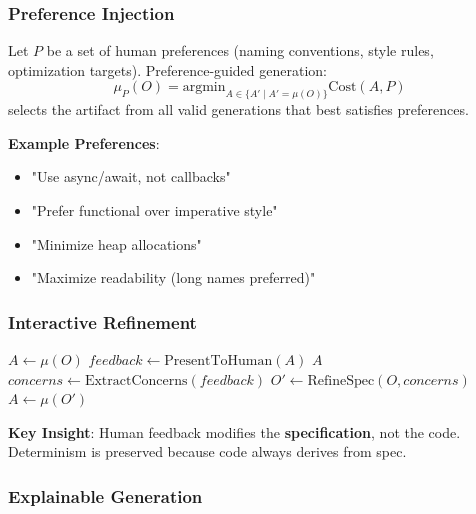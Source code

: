 \subsubsection{Preference Injection}

\begin{definition}
    Let $P$ be a set of human preferences (naming conventions, style rules, optimization targets). Preference-guided generation:
    \begin{equation}
        \mu_P(O) = \text{argmin}_{A \in \{A' \mid A' = \mu(O)\}} \text{Cost}(A, P)
    \end{equation}
    selects the artifact from all valid generations that best satisfies preferences.
\end{definition}

\textbf{Example Preferences}:
\begin{itemize}
    \item "Use async/await, not callbacks"
    \item "Prefer functional over imperative style"
    \item "Minimize heap allocations"
    \item "Maximize readability (long names preferred)"
\end{itemize}

\subsubsection{Interactive Refinement}

\begin{algorithm}
\caption{Interactive Generation Loop}
\begin{algorithmic}[1]
    \State $A \gets \mu(O)$
        \State $feedback \gets \text{PresentToHuman}(A)$
            \State \Return $A$
            \State $concerns \gets \text{ExtractConcerns}(feedback)$
            \State $O' \gets \text{RefineSpec}(O, concerns)$
            \State $A \gets \mu(O')$
        \EndIf
    \EndWhile
\EndProcedure
\end{algorithmic}
\end{algorithm}

\textbf{Key Insight}: Human feedback modifies the \textbf{specification}, not the code. Determinism is preserved because code always derives from spec.

\subsubsection{Explainable Generation}

